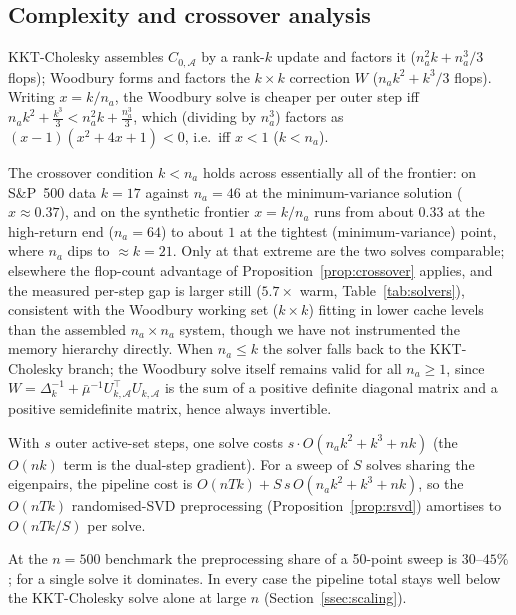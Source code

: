 \subsection{Complexity and crossover analysis}

\begin{proposition}\label{prop:crossover}
KKT-Cholesky assembles $C_{0,\mathcal{A}}$ by a rank-$k$ update and factors it
($n_a^2 k + n_a^3/3$ flops); Woodbury forms and factors the $k \times k$
correction $W$ ($n_a k^2 + k^3/3$ flops). Writing $x = k/n_a$, the Woodbury solve
is cheaper per outer step iff
$n_a k^2 + \tfrac{k^3}{3} < n_a^2 k + \tfrac{n_a^3}{3}$, which (dividing by
$n_a^3$) factors as $(x-1)(x^2 + 4x + 1) < 0$, i.e.\ iff $x < 1$ ($k < n_a$).
\end{proposition}

\begin{remark}\label{rem:crossover}
The crossover condition $k < n_a$ holds across essentially all of the frontier:
on S\&P~500 data $k = 17$ against $n_a = 46$ at the minimum-variance solution
($x \approx 0.37$), and on the synthetic frontier $x = k/n_a$ runs from about
$0.33$ at the high-return end ($n_a = 64$) to about $1$ at the tightest
(minimum-variance) point, where $n_a$ dips to $\approx k = 21$. Only at that
extreme are the two solves comparable; elsewhere the flop-count advantage of
Proposition~\ref{prop:crossover} applies, and the measured per-step gap is larger
still ($5.7\times$ warm, Table~\ref{tab:solvers}), consistent with the Woodbury
working set ($k \times k$) fitting in lower cache levels than the assembled
$n_a \times n_a$ system, though we have not instrumented the memory hierarchy
directly. When $n_a \leq k$ the solver falls back to the KKT-Cholesky branch; the
Woodbury solve itself remains valid for all $n_a \geq 1$, since
$W = \Delta_k^{-1} + \bar\mu^{-1}U_{k,\mathcal{A}}^\top U_{k,\mathcal{A}}$
is the sum of a positive definite diagonal matrix and a positive semidefinite
matrix, hence always invertible.
\end{remark}

\begin{proposition}\label{prop:pipeline}
With $s$ outer active-set steps, one solve costs $s\cdot O(n_a k^2 + k^3 + nk)$
(the $O(nk)$ term is the dual-step gradient). For a sweep of $S$ solves sharing the
eigenpairs, the pipeline cost is $O(nTk) + S\,s\,O(n_a k^2 + k^3 + nk)$, so the
$O(nTk)$ randomised-SVD preprocessing (Proposition~\ref{prop:rsvd}) amortises to
$O(nTk/S)$ per solve.
\end{proposition}

At the $n=500$ benchmark the preprocessing share of a 50-point sweep is
$30$--$45\%$; for a single solve it dominates. In every case the pipeline total
stays well below the KKT-Cholesky solve alone at large $n$
(Section~\ref{ssec:scaling}).
